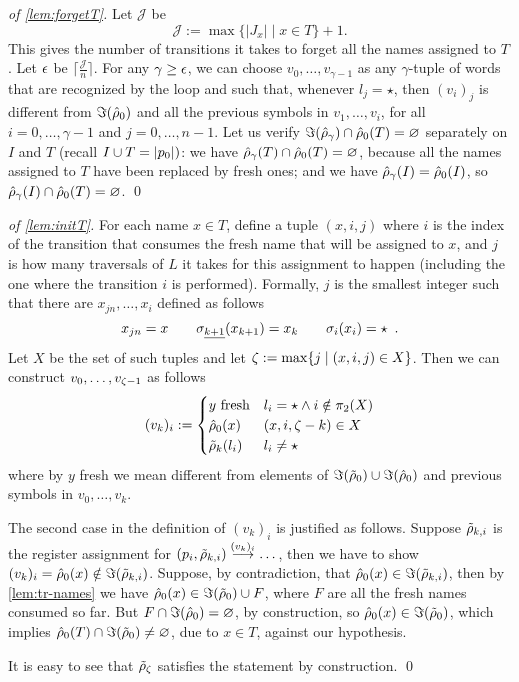 \begin{proof}[of \cref{lem:forgetT}]
Let $\mathcal{J}$ be
\[
	\mathcal{J} := \max \{ |J_x|\mid x \in T \} + 1 .
\]
This gives the number of transitions it takes to forget all the names assigned to $T$. Let $\epsilon$ be $\lceil \frac{\mathcal{J}}{n} \rceil$. For any $\gamma \geq \epsilon$, we can choose $v_0,\dots,v_{\gamma-1}$ as any $\gamma$-tuple of words that are recognized by the loop and such that, whenever $l_j = \star$, then $(v_i)_j$ is different from $\Im(\hat{\rho}_0)$ and all the previous symbols in $v_1,\dots,v_i$, for all $i=0,\dots,\gamma-1$ and $j=0,\dots,n-1$. Let us verify $\Im(\hat{\rho}_\gamma) \cap \hat{\rho}_0(T) = \varnothing$ separately on $I$ and $T$ (recall $I \cup T = |p_0|)$: we have $\hat{\rho}_\gamma(T) \cap \hat{\rho}_0(T) = \varnothing$, because all the names assigned to $T$ have been replaced by fresh ones; and we have $\hat{\rho}_\gamma(I) = \hat{\rho}_0(I)$, so $\hat{\rho}_\gamma(I) \cap \hat{\rho}_0(T) = \varnothing$.
\qed
\end{proof}


\begin{proof}[of \cref{lem:initT}]
For each name $x \in T$, define a tuple $(x,i,j)$ where $i$ is the index of the transition that consumes the fresh name that will be assigned to $x$, and $j$ is how many traversals of $L$ it takes for this assignment to happen (including the one where the transition $i$ is performed). Formally, $j$ is the smallest integer such that there are $x_{jn},\dots,x_i$ defined as follows
\[
	x_{jn} = x \qquad \sigma_{\underline{k+1}}(x_{k+1}) = x_k \qquad \sigma_i(x_i) = \star \enspace .
\]
Let $X$ be the set of such tuples and let $\zeta := \max \{ j \mid (x,i,j) \in X \}$. Then we can construct $v_0,\dots,v_{\zeta-1}$ as follows
\[
	(v_k)_i :=
	\begin{cases}
		\text{$y$ fresh} & l_i = \star \land i \notin \pi_2(X) \\
		\hat{\rho}_0(x) & (x,i,\zeta - k) \in X
		 \\
		\tilde{\rho}_{k}(l_i) & l_i \neq \star
	\end{cases}
\]
%
where by $y$ fresh we mean different from elements of $\Im(\tilde{\rho}_0) \cup \Im(\hat{\rho}_0)$ and previous symbols in $v_0,\dots,v_{k}$.

The second case in the definition of $(v_k)_i$ is justified as follows. Suppose $\tilde{\rho}_{k,i}$ is the register assignment for $(p_i,\tilde{\rho}_{k,i}) \overset{(v_k)_i}{\longrightarrow} \dots$, then we have to show $(v_k)_i = \hat{\rho}_0(x) \notin \Im(\tilde{\rho}_{k,i})$. Suppose, by contradiction, that $\hat{\rho}_0(x) \in \Im(\tilde{\rho}_{k,i})$, then by \cref{lem:tr-names} we have $\hat{\rho}_0(x) \in \Im(\tilde{\rho}_0) \cup F$, where $F$ are all the fresh names consumed so far. But $F \cap \Im(\hat{\rho}_0) = \varnothing$, by construction, so $\hat{\rho}_0(x) \in \Im(\tilde{\rho}_0)$, which implies $\hat{\rho}_0(T) \cap \Im(\tilde{\rho}_0) \neq \varnothing$, due to $x \in T$, against our hypothesis.

It is easy to see that $\tilde{\rho}_\zeta$ satisfies the statement by construction.
\qed
\end{proof}

